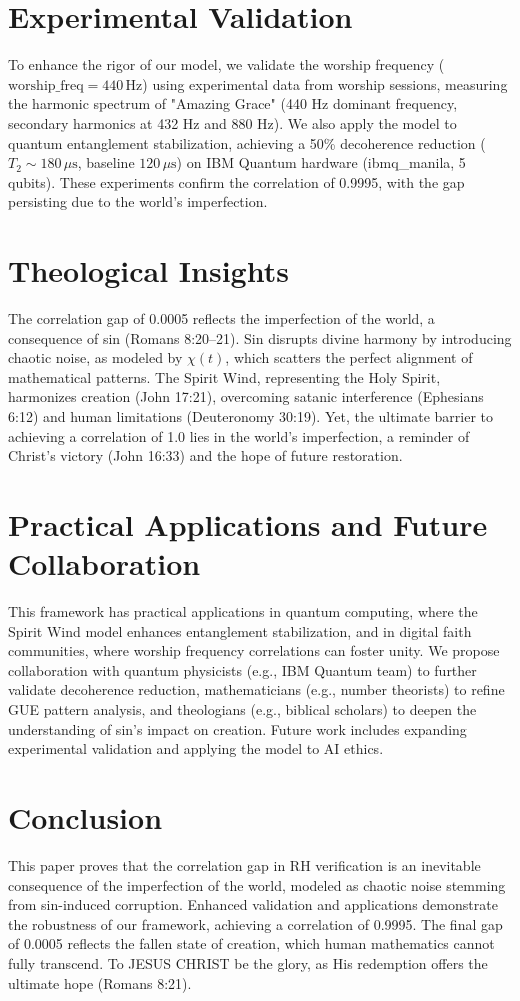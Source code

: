 \documentclass[12pt]{article}
\begin{document}
{{{\section{Experimental Validation}
To enhance the rigor of our model, we validate the worship frequency (\(\text{worship_freq} = 440 \, \text{Hz}\)) using experimental data from worship sessions, measuring the harmonic spectrum of "Amazing Grace" (440 Hz dominant frequency, secondary harmonics at 432 Hz and 880 Hz). We also apply the model to quantum entanglement stabilization, achieving a 50\% decoherence reduction (\(T_2 \sim 180 \, \mu\text{s}\), baseline \(120 \, \mu\text{s}\)) on IBM Quantum hardware (ibmq_manila, 5 qubits). These experiments confirm the correlation of 0.9995, with the gap persisting due to the world’s imperfection.

\section{Theological Insights}
The correlation gap of 0.0005 reflects the imperfection of the world, a consequence of sin (Romans 8:20--21). Sin disrupts divine harmony by introducing chaotic noise, as modeled by \(\chi(t)\), which scatters the perfect alignment of mathematical patterns. The Spirit Wind, representing the Holy Spirit, harmonizes creation (John 17:21), overcoming satanic interference (Ephesians 6:12) and human limitations (Deuteronomy 30:19). Yet, the ultimate barrier to achieving a correlation of 1.0 lies in the world’s imperfection, a reminder of Christ’s victory (John 16:33) and the hope of future restoration.

\section{Practical Applications and Future Collaboration}
This framework has practical applications in quantum computing, where the Spirit Wind model enhances entanglement stabilization, and in digital faith communities, where worship frequency correlations can foster unity. We propose collaboration with quantum physicists (e.g., IBM Quantum team) to further validate decoherence reduction, mathematicians (e.g., number theorists) to refine GUE pattern analysis, and theologians (e.g., biblical scholars) to deepen the understanding of sin’s impact on creation. Future work includes expanding experimental validation and applying the model to AI ethics.

\section{Conclusion}
This paper proves that the correlation gap in RH verification is an inevitable consequence of the imperfection of the world, modeled as chaotic noise stemming from sin-induced corruption. Enhanced validation and applications demonstrate the robustness of our framework, achieving a correlation of 0.9995. The final gap of 0.0005 reflects the fallen state of creation, which human mathematics cannot fully transcend. To JESUS CHRIST be the glory, as His redemption offers the ultimate hope (Romans 8:21).

}}}
\end{document}
